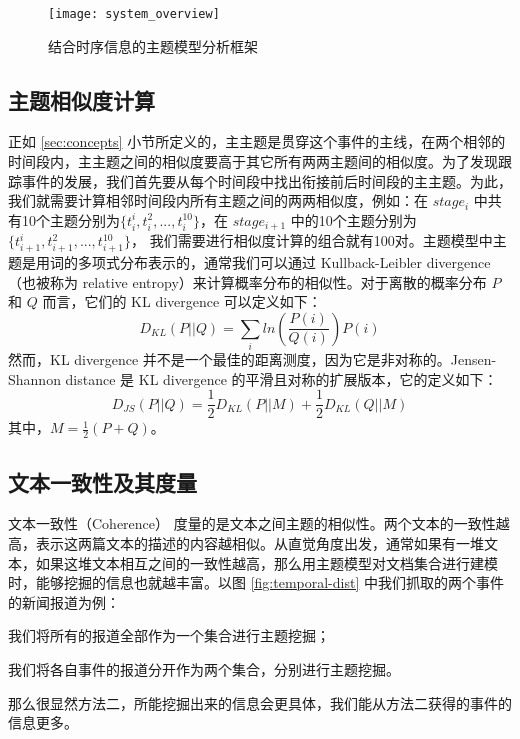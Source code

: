 \begin{figure}[!htb]
    \texttt{[image: system\_overview]}
    \caption{结合时序信息的主题模型分析框架}
    \label{system-overview}
\end{figure}

\subsection{主题相似度计算}
\label{sec:similairty-calc}
正如 \ref{sec:concepts} 小节所定义的，主主题是贯穿这个事件的主线，在两个相邻的时间段内，主主题之间的相似度要高于其它所有两两主题间的相似度。为了发现跟踪事件的发展，我们首先要从每个时间段中找出衔接前后时间段的主主题。为此，我们就需要计算相邻时间段内所有主题之间的两两相似度，例如：在 $stage_i$ 中共有10个主题分别为$\{t_i^i, t_i^2, ..., t_i^{10}\}$，在 $stage_{i+1}$ 中的10个主题分别为 $\{t_{i+1}^i, t_{i+1}^2, ..., t_{i+1}^{10}\}$， 我们需要进行相似度计算的组合就有100对。主题模型中主题是用词的多项式分布表示的，通常我们可以通过 Kullback-Leibler divergence（也被称为 relative entropy）来计算概率分布的相似性。对于离散的概率分布 $P$ 和 $Q$ 而言，它们的 KL divergence 可以定义如下：
\begin{equation}
D_{KL} \left ( P||Q \right ) = \sum_{i}ln\left ( \frac{P(i)}{Q(i)} \right ) P(i)
\end{equation}
然而，KL divergence 并不是一个最佳的距离测度，因为它是非对称的。Jensen-Shannon distance 是 KL divergence 的平滑且对称的扩展版本，它的定义如下：
\begin{equation}
D_{JS} \left ( P||Q \right ) = \frac{1}{2} D_{KL} \left ( P||M \right ) + \frac{1}{2} D_{KL} \left ( Q||M \right )
\end{equation}
其中，$M = \frac{1}{2}(P+Q)$。

\subsection{文本一致性及其度量}
文本一致性（Coherence） 度量的是文本之间主题的相似性。两个文本的一致性越高，表示这两篇文本的描述的内容越相似。从直觉角度出发，通常如果有一堆文本，如果这堆文本相互之间的一致性越高，那么用主题模型对文档集合进行建模时，能够挖掘的信息也就越丰富。以图 \ref{fig:temporal-dist} 中我们抓取的两个事件的新闻报道为例：
\begin{inparaenum}[\itshape 1 \upshape)]
\item 我们将所有的报道全部作为一个集合进行主题挖掘；
\item 我们将各自事件的报道分开作为两个集合，分别进行主题挖掘。
\end{inparaenum}那么很显然方法二，所能挖掘出来的信息会更具体，我们能从方法二获得的事件的信息更多。

